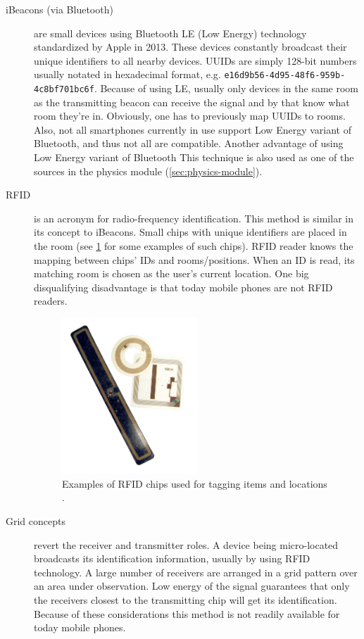\begin{description}
	\item[iBeacons (via Bluetooth)] are small devices using Bluetooth LE (Low Energy) technology standardized by Apple in 2013. These devices constantly broadcast their unique identifiers to all nearby devices. UUIDs are simply 128-bit numbers usually notated in hexadecimal format, e.g. \texttt{e16d9b56-4d95-48f6-959b-4c8bf701bc6f}. Because of using LE, usually only devices in the same room as the transmitting beacon can receive the signal and by that know what room they're in. Obviously, one has to previously map UUIDs to rooms. Also, not all smartphones currently in use support Low Energy variant of Bluetooth, and thus not all are compatible. Another advantage of using Low Energy variant of Bluetooth  This technique is also used as one of the sources in the physics module (\cref{sec:physics-module}).
	
	\item[RFID] is an acronym for radio-frequency identification. This method is similar in its concept to iBeacons. Small chips with unique identifiers are placed in the room (see \cref{fig:rfid} for some examples of such chips). RFID reader knows the mapping between chips' IDs and rooms/positions. When an ID is read, its matching room is chosen as the user's current location. One big disqualifying disadvantage is that today mobile phones are not RFID readers.
	
	\begin{figure}[h]
		\centering
		\includegraphics[width=0.5\textwidth]{rfid}
		\caption{Examples of RFID chips used for tagging items and locations \cite{wiki:rfid}.}
		\label{fig:rfid}
	\end{figure}
	
	\item[Grid concepts] revert the receiver and transmitter roles. A device being micro-located broadcasts its identification information, usually by using RFID technology. A large number of receivers are arranged in a grid pattern over an area under observation. Low energy of the signal guarantees that only the receivers closest to the transmitting chip will get its identification. Because of these considerations this method is not readily available for today mobile phones.
	

\end{description}
